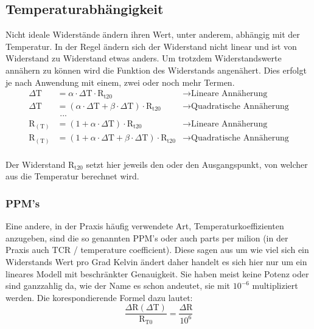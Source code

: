 \subsection{Temperaturabhängigkeit}

Nicht ideale Widerstände ändern ihren Wert, unter anderem, abhängig mit der Temperatur. 
In der Regel ändern sich der Widerstand nicht linear und ist von Widerstand zu Widerstand etwas anders. 
Um trotzdem Widerstandswerte annähern zu können wird die Funktion des Widerstands angenähert. 
Dies erfolgt je nach Anwendung mit einem, zwei oder noch mehr Termen.
\[
\begin{aligned}
    \Delta\text{T}& = \alpha\cdot\Delta\text{T}\cdot\text{R}_\text{t20} &\rightarrow \text{Lineare Annäherung}\\
    \Delta\text{T}& = (\alpha\cdot\Delta\text{T} + \beta\cdot\Delta\text{T})\cdot\text{R}_\text{t20} &\rightarrow \text{Quadratische Annäherung}\\
    &\text{ ...}\\
    \text{R}_{(\text{T})}& = (1 + \alpha\cdot\Delta\text{T})\cdot\text{R}_\text{t20} &\rightarrow \text{Lineare Annäherung}\\
    \text{R}_{(\text{T})}& = (1 + \alpha\cdot\Delta\text{T} + \beta\cdot\Delta\text{T})\cdot\text{R}_\text{t20} &\rightarrow \text{Quadratische Annäherung}\\
\end{aligned}
\]

Der Widerstand $\text{R}_\text{t20}$ setzt hier jeweils den  oder den Ausgangspunkt, von welcher aus die Temperatur berechnet wird.

\subsubsection{PPM's}

Eine andere, in der Praxis häufig verwendete Art, Temperaturkoeffizienten anzugeben, sind die so genannten PPM's oder auch parts per milion (in der Praxis auch TCR / temperature coefficient). 
Diese sagen aus um wie viel sich ein Widerstands Wert pro Grad Kelvin ändert daher handelt es sich hier nur um ein lineares Modell mit beschränkter Genauigkeit. 
Sie haben meist keine Potenz oder sind ganzzahlig da, wie der Name es schon andeutet, sie mit $10^{-6}$ multipliziert werden. 
Die korespondierende Formel dazu lautet:\\
\[
    \frac{\Delta\text{R}(\Delta\text{T})}{\text{R}_{\text{T0}}} = \frac{\Delta\text{R}}{10^{6}}
\]
